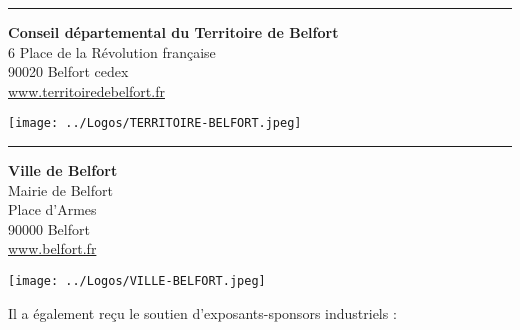 \hrule
%
\vspace{1.5mm}
\noindent
\begin{minipage}{0.55\textwidth}
\textbf{Conseil départemental du Territoire de Belfort}\\
6 Place de la Révolution française\\
90020 Belfort cedex\\
\url{www.territoiredebelfort.fr}
\end{minipage}
\begin{minipage}{0.43\textwidth}
	\centering \texttt{[image: ../Logos/TERRITOIRE-BELFORT.jpeg]}
\end{minipage}
\vspace{1.5mm}
\hrule
%
\vspace{1.5mm}
\noindent
\begin{minipage}{0.55\textwidth}
\textbf{Ville de Belfort}\\
Mairie de Belfort\\
Place d'Armes\\
90000 Belfort\\
\url{www.belfort.fr}
\end{minipage}
\begin{minipage}{0.43\textwidth}
	\centering \texttt{[image: ../Logos/VILLE-BELFORT.jpeg]}
\end{minipage}
\vspace{1.5mm}



\clearpage

Il a également reçu le soutien d’exposants-sponsors industriels :\\[1em]


